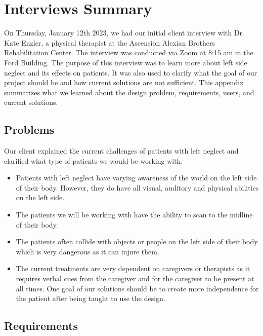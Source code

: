 \chapter{Interviews Summary}
\label{chap:interviews}

On Thursday, January 12th 2023, we had our initial client interview with
Dr. Kate Enzler, a physical therapist at the Ascension Alexian Brothers
Rehabilitation Center. The interview was conducted via Zoom at 8:15 am in the
Ford Building. The purpose of this interview was to learn more about left side
neglect and its effects on patients. It was also used to clarify what the goal
of our project should be and how current solutions are not sufficient. This
appendix summarizes what we learned about the design problem, requirements,
users, and current solutions.

\section{Problems}

Our client explained the current challenges of patients with left neglect and
clarified what type of patients we would be working with.
\begin{itemize}
\item Patients with left neglect have varying awareness of the world on the
  left side of their body. However, they do have all visual, auditory and
  physical abilities on the left side.
\item The patients we will be working with have the ability to scan to the
  midline of their body.
\item The patients often collide with objects or people on the left side of
  their body which is very dangerous as it can injure them. 
\item The current treatments are very dependent on caregivers or therapists as
  it requires verbal cues from the caregiver and for the caregiver to be
  present at all times. One goal of our solutions should be to create more
  independence for the patient after being taught to use the design.
\end{itemize}

\section{Requirements}

